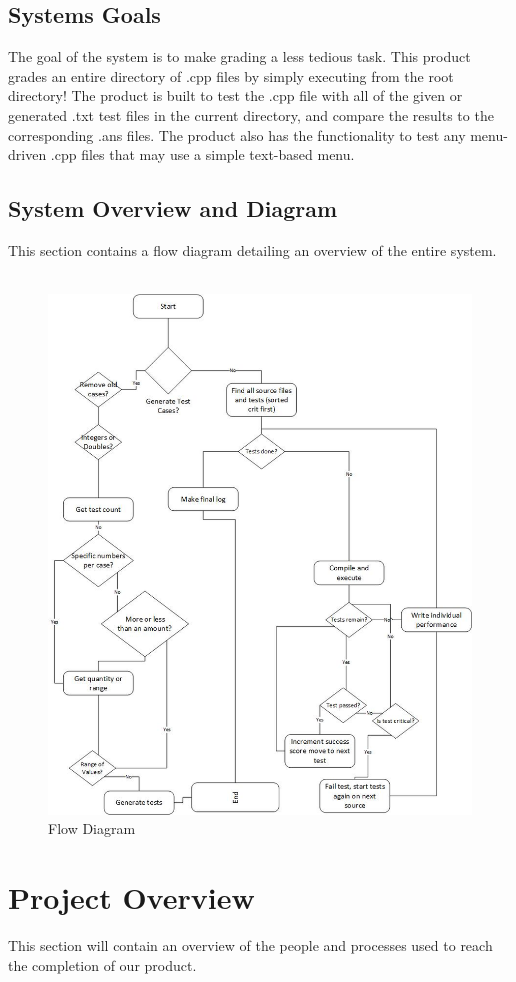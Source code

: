 \documentclass {article}
\begin{document}
		 \subsection{\Large{\color{blue}Systems Goals}}
		 	The goal of the system is to make grading a less tedious
		 	 task. This product grades an entire directory of .cpp files
		 	 by simply executing from the root directory! The product is
		 	 built to test the .cpp file with all of the given or
		 	 generated .txt test files in the current directory, and
		 	 compare the results to the corresponding .ans files. The
		 	 product also has the functionality to test any menu-driven
		 	 .cpp files that may use a simple text-based menu.
		 		 
		 \subsection{\Large{\color{blue}System Overview and Diagram}}
		 	This section contains a flow diagram detailing an overview
		 	 of the entire system.\\\\
		 	\begin{figure}[h!]
		 		\centering
				\includegraphics[width=0.7\linewidth]{diagram.jpg}
				\caption{Flow Diagram}
				\label{fig:Flow_Diagram}
			\end{figure}
		 		
		 \newpage
		 		
	\section{\LARGE{\color{blue}Project Overview}}
		This section will contain an overview of the people and processes
		 used to reach the completion of our product.
		 	 
\end{document}
